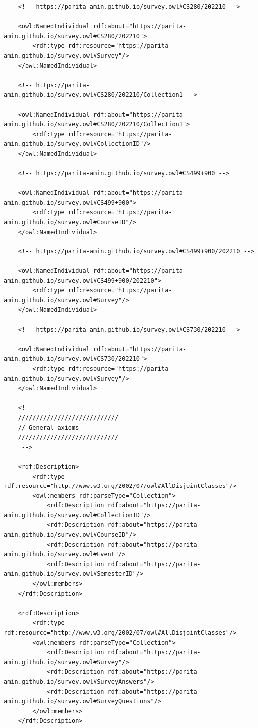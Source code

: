 \begin{lstlisting}
    <!-- https://parita-amin.github.io/survey.owl#CS280/202210 -->

    <owl:NamedIndividual rdf:about="https://parita-amin.github.io/survey.owl#CS280/202210">
        <rdf:type rdf:resource="https://parita-amin.github.io/survey.owl#Survey"/>
    </owl:NamedIndividual>
    
    <!-- https://parita-amin.github.io/survey.owl#CS280/202210/Collection1 -->

    <owl:NamedIndividual rdf:about="https://parita-amin.github.io/survey.owl#CS280/202210/Collection1">
        <rdf:type rdf:resource="https://parita-amin.github.io/survey.owl#CollectionID"/>
    </owl:NamedIndividual>
    
    <!-- https://parita-amin.github.io/survey.owl#CS499+900 -->

    <owl:NamedIndividual rdf:about="https://parita-amin.github.io/survey.owl#CS499+900">
        <rdf:type rdf:resource="https://parita-amin.github.io/survey.owl#CourseID"/>
    </owl:NamedIndividual>
    
    <!-- https://parita-amin.github.io/survey.owl#CS499+900/202210 -->

    <owl:NamedIndividual rdf:about="https://parita-amin.github.io/survey.owl#CS499+900/202210">
        <rdf:type rdf:resource="https://parita-amin.github.io/survey.owl#Survey"/>
    </owl:NamedIndividual>
    
    <!-- https://parita-amin.github.io/survey.owl#CS730/202210 -->

    <owl:NamedIndividual rdf:about="https://parita-amin.github.io/survey.owl#CS730/202210">
        <rdf:type rdf:resource="https://parita-amin.github.io/survey.owl#Survey"/>
    </owl:NamedIndividual>
    
    <!-- 
    ////////////////////////////
    // General axioms
    ////////////////////////////
     -->

    <rdf:Description>
        <rdf:type rdf:resource="http://www.w3.org/2002/07/owl#AllDisjointClasses"/>
        <owl:members rdf:parseType="Collection">
            <rdf:Description rdf:about="https://parita-amin.github.io/survey.owl#CollectionID"/>
            <rdf:Description rdf:about="https://parita-amin.github.io/survey.owl#CourseID"/>
            <rdf:Description rdf:about="https://parita-amin.github.io/survey.owl#Event"/>
            <rdf:Description rdf:about="https://parita-amin.github.io/survey.owl#SemesterID"/>
        </owl:members>
    </rdf:Description>
    
    <rdf:Description>
        <rdf:type rdf:resource="http://www.w3.org/2002/07/owl#AllDisjointClasses"/>
        <owl:members rdf:parseType="Collection">
            <rdf:Description rdf:about="https://parita-amin.github.io/survey.owl#Survey"/>
            <rdf:Description rdf:about="https://parita-amin.github.io/survey.owl#SurveyAnswers"/>
            <rdf:Description rdf:about="https://parita-amin.github.io/survey.owl#SurveyQuestions"/>
        </owl:members>
    </rdf:Description>
    

\end{lstlisting}
